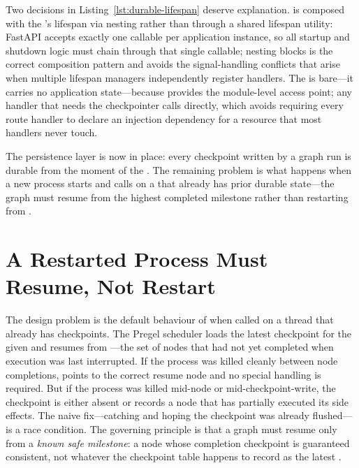 Two decisions in Listing~\ref{lst:durable-lifespan} deserve explanation.
 is composed with the 's lifespan
via nesting rather than through a shared lifespan utility: FastAPI accepts
exactly one  callable per application instance, so all
startup and shutdown logic must chain through that single callable;
nesting  blocks is the correct composition pattern and
avoids the signal-handling conflicts that arise when multiple lifespan
managers independently register  handlers. The 
is bare---it carries no application state---because 
provides the module-level access point; any handler that needs the
checkpointer calls  directly, which avoids
requiring every route handler to declare an injection dependency for a
resource that most handlers never touch.

The persistence layer is now in place: every checkpoint written by a
graph run is durable from the moment of the . The remaining
problem is what happens when a new process starts and calls 
on a  that already has prior durable state---the graph
must resume from the highest completed milestone rather than restarting
from .


\section{A Restarted Process Must Resume, Not Restart}
\label{sec:durable-recovery}

The design problem is the default behaviour of  when called
on a thread that already has checkpoints. The Pregel scheduler loads the
latest checkpoint for the given  and resumes from
---the set of nodes that had not yet completed
when execution was last interrupted. If the process was killed cleanly
between node completions,  points to the correct resume node
and no special handling is required. But if the process was killed
mid-node or mid-checkpoint-write, the checkpoint is either absent or
records a node that has partially executed its side effects. The naive
fix---catching  and hoping the checkpoint was already
flushed---is a race condition. The governing principle is that a graph
must resume only from a \emph{known safe milestone}: a node whose
completion checkpoint is guaranteed consistent, not whatever the
checkpoint table happens to record as the latest .

